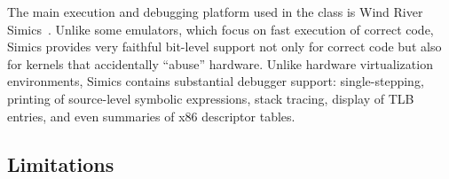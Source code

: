 The main execution and debugging
platform used in the class is
Wind River Simics~\cite{simics}.
Unlike some emulators,
which focus on fast execution of correct code,
Simics
provides very faithful bit-level support
not only for correct code %
but also for kernels that accidentally ``abuse'' hardware.
Unlike hardware virtualization environments,
Simics contains substantial debugger support:
single-stepping,
printing of source-level symbolic
expressions,
stack tracing,
display of TLB entries,
and even summaries of x86
descriptor tables.


\subsection{Limitations}


